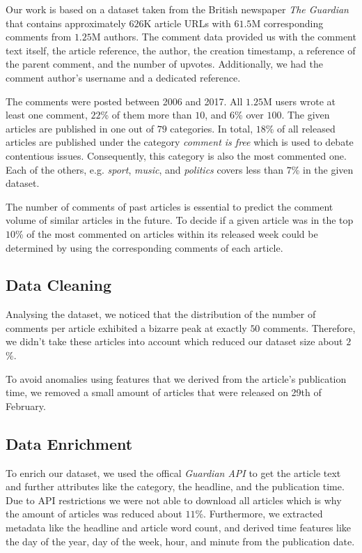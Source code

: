 Our work is based on a dataset taken from the British newspaper \textit{The Guardian} that contains approximately $626$K article URLs with $61.5$M corresponding comments from $1.25$M authors.
The comment data provided us with the comment text itself, the article reference, the author, the creation timestamp, a reference of the parent comment, and the number of upvotes. Additionally, we had the comment author's username and a dedicated reference.

The comments were posted between 2006 and 2017. All $1.25$M users wrote at least one comment, $22$\% of them more than $10$, and $6$\% over $100$.
The given articles are published in one out of $79$ categories. In total, $18$\% of all released articles are published under the category \textit{comment is free} which is used to debate contentious issues. Consequently, this category is also the most commented one. 
Each of the others, e.g. \textit{sport}, \textit{music}, and \textit{politics} covers less than $7$\% in the given dataset.

The number of comments of past articles is essential to predict the comment volume of similar articles in the future. 
To decide if a given article was in the top $10$\% of the most commented on articles within its released week could be determined by using the corresponding comments of each article.

\subsection{Data Cleaning}
Analysing the dataset, we noticed that the distribution of the number of comments per article exhibited a bizarre peak at exactly $50$ comments. Therefore, we didn't take these articles into account which reduced our dataset size about $2$\%.

To avoid anomalies using features that we derived from the article's publication time, we removed a small amount of articles that were released on 29th of February.

\subsection{Data Enrichment}
To enrich our dataset, we used the offical \textit{Guardian API} to get the article text and further attributes like the category, the headline, and the publication time.
Due to API restrictions we were not able to download all articles which is why the amount of articles was reduced about $11$\%.
Furthermore, we extracted metadata like the headline and article word count, and derived time features like the day of the year, day of the week, hour, and minute from the publication date.

